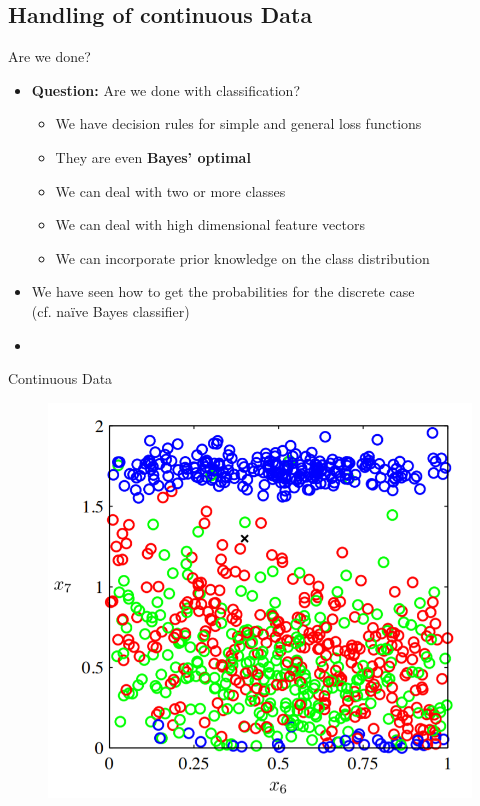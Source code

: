 \subsection{Handling of continuous Data}

\begin{frame}{Are we done?}{}
	\begin{itemize}
		\item \textbf{Question:} Are we done with classification?
		\begin{itemize}
			\item We have decision rules for simple and general loss functions
			\item They are even \textbf{Bayes' optimal}
			\item We can deal with two or more classes
			\item We can deal with high dimensional feature vectors
			\item We can incorporate prior knowledge on the class distribution
		\end{itemize}
		\item We have seen how to get the probabilities for the discrete case \\
			(cf. na\"{i}ve Bayes classifier)
		\item {}
	\end{itemize}
\end{frame}


\begin{frame}{Continuous Data}{}
	\begin{figure}
		\centering
		\includegraphics[scale=0.4]{03_decision_theory/02_img/continuous_data}
	\end{figure}
\end{frame}



